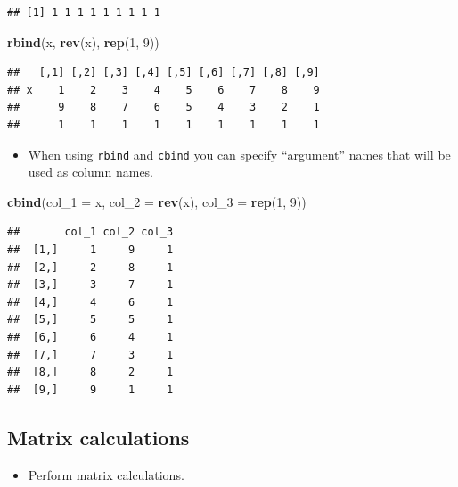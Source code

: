 \documentclass[]{book}
\newenvironment{Shaded}{\begin{snugshade}}{\end{snugshade}}
\newcommand{\KeywordTok}[1]{\textcolor[rgb]{0.13,0.29,0.53}{\textbf{#1}}}
\newcommand{\DataTypeTok}[1]{\textcolor[rgb]{0.13,0.29,0.53}{#1}}
\newcommand{\DecValTok}[1]{\textcolor[rgb]{0.00,0.00,0.81}{#1}}
\newcommand{\NormalTok}[1]{#1}
\providecommand{\tightlist}{%
  \setlength{\itemsep}{0pt}\setlength{\parskip}{0pt}}
\begin{document}
\begin{verbatim}
## [1] 1 1 1 1 1 1 1 1 1
\end{verbatim}

\begin{Shaded}
\begin{Highlighting}[]
\KeywordTok{rbind}\NormalTok{(x, }\KeywordTok{rev}\NormalTok{(x), }\KeywordTok{rep}\NormalTok{(}\DecValTok{1}\NormalTok{, }\DecValTok{9}\NormalTok{))}
\end{Highlighting}
\end{Shaded}

\begin{verbatim}
##   [,1] [,2] [,3] [,4] [,5] [,6] [,7] [,8] [,9]
## x    1    2    3    4    5    6    7    8    9
##      9    8    7    6    5    4    3    2    1
##      1    1    1    1    1    1    1    1    1
\end{verbatim}

\begin{itemize}
\tightlist
\item
  When using \texttt{rbind} and \texttt{cbind} you can specify
  ``argument'' names that will be used as column names.
\end{itemize}

\begin{Shaded}
\begin{Highlighting}[]
\KeywordTok{cbind}\NormalTok{(}\DataTypeTok{col_1 =}\NormalTok{ x, }\DataTypeTok{col_2 =} \KeywordTok{rev}\NormalTok{(x), }\DataTypeTok{col_3 =} \KeywordTok{rep}\NormalTok{(}\DecValTok{1}\NormalTok{, }\DecValTok{9}\NormalTok{))}
\end{Highlighting}
\end{Shaded}

\begin{verbatim}
##       col_1 col_2 col_3
##  [1,]     1     9     1
##  [2,]     2     8     1
##  [3,]     3     7     1
##  [4,]     4     6     1
##  [5,]     5     5     1
##  [6,]     6     4     1
##  [7,]     7     3     1
##  [8,]     8     2     1
##  [9,]     9     1     1
\end{verbatim}

\subsection{Matrix calculations}\label{matrix-calculations}

\begin{itemize}
\tightlist
\item
  Perform matrix calculations.
\end{itemize}
\end{document}

